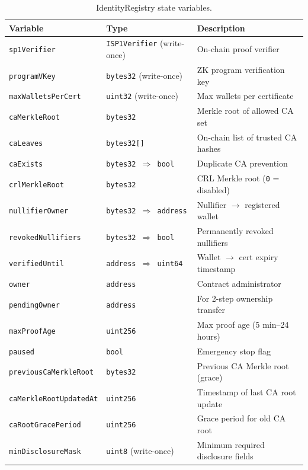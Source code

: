 \documentclass[11pt, a4paper]{article}
\begin{document}
\begin{table}[ht]
\centering
\small
\caption{IdentityRegistry state variables.}
\label{tab:state-variables}
\begin{tabular}{@{}lll@{}}
\toprule
Variable & Type & Description \\
\midrule
\texttt{sp1Verifier} & \texttt{ISP1Verifier} (write-once) & On-chain proof verifier \\
\texttt{programVKey} & \texttt{bytes32} (write-once) & ZK program verification key \\
\texttt{maxWalletsPerCert} & \texttt{uint32} (write-once) & Max wallets per certificate \\
\texttt{caMerkleRoot} & \texttt{bytes32} & Merkle root of allowed CA set \\
\texttt{caLeaves} & \texttt{bytes32[]} & On-chain list of trusted CA hashes \\
\texttt{caExists} & \texttt{bytes32 $\Rightarrow$ bool} & Duplicate CA prevention \\
\texttt{crlMerkleRoot} & \texttt{bytes32} & CRL Merkle root (\texttt{0} = disabled) \\
\texttt{nullifierOwner} & \texttt{bytes32 $\Rightarrow$ address} & Nullifier $\rightarrow$ registered wallet \\
\texttt{revokedNullifiers} & \texttt{bytes32 $\Rightarrow$ bool} & Permanently revoked nullifiers \\
\texttt{verifiedUntil} & \texttt{address $\Rightarrow$ uint64} & Wallet $\rightarrow$ cert expiry timestamp \\
\texttt{owner} & \texttt{address} & Contract administrator \\
\texttt{pendingOwner} & \texttt{address} & For 2-step ownership transfer \\
\texttt{maxProofAge} & \texttt{uint256} & Max proof age (5 min--24 hours) \\
\texttt{paused} & \texttt{bool} & Emergency stop flag \\
\texttt{previousCaMerkleRoot} & \texttt{bytes32} & Previous CA Merkle root (grace) \\
\texttt{caMerkleRootUpdatedAt} & \texttt{uint256} & Timestamp of last CA root update \\
\texttt{caRootGracePeriod} & \texttt{uint256} & Grace period for old CA root \\
\texttt{minDisclosureMask} & \texttt{uint8} (write-once) & Minimum required disclosure fields \\
\bottomrule
\end{tabular}
\end{table}
\end{document}
